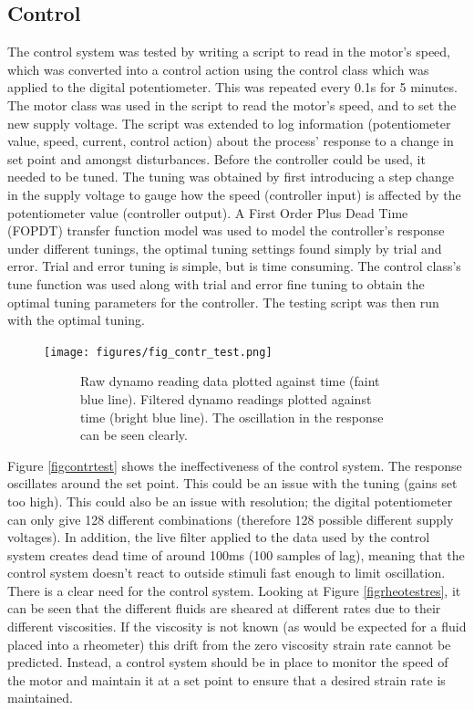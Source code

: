 \documentclass[twoside,a4]{report}
\def\br{\newline \newline \noindent}
\begin{document}
	\subsection*{Control}
	The control system was tested by writing a script to read in the motor's speed, which was converted into a control action using the control class which was applied to the digital potentiometer. This was repeated every 0.1s for 5 minutes. The motor class was used in the script to read the motor's speed, and to set the new supply voltage. The script was extended to log information (potentiometer value, speed, current, control action) about the process' response to a change in set point and amongst disturbances.
	\br
	Before the controller could be used, it needed to be tuned. The tuning was obtained by first introducing a step change in the supply voltage to gauge how the speed (controller input) is affected by the potentiometer value (controller output). A First Order Plus Dead Time (FOPDT) transfer function model was used to model the controller's response under different tunings, the optimal tuning settings found simply by trial and error.
	\br
	Trial and error tuning is simple, but is time consuming. The control class's tune function was used along with trial and error fine tuning to obtain the optimal tuning parameters for the controller. The testing script was then run with the optimal tuning.
	\newline
	
	\begin{figure}[!htb]
		\centering
		\texttt{[image: figures/fig\_contr\_test.png]}
		\caption{Controller Test}
		\label{figcontrtest}
		\begin{subfigure}{0.6\textwidth}
			\footnotesize Raw dynamo reading data plotted against time (faint blue line). Filtered dynamo readings plotted against time (bright blue line). The oscillation in the response can be seen clearly.
		\end{subfigure}
	\end{figure}
	
	\noindent
	Figure \ref{figcontrtest} shows the ineffectiveness of the control system. The response oscillates around the set point. This could be an issue with the tuning (gains set too high). This could also be an issue with resolution; the digital potentiometer can only give 128 different combinations (therefore 128 possible different supply voltages). In addition, the live filter applied to the data used by the control system creates dead time of around 100ms (100 samples of lag), meaning that the control system doesn't react to outside stimuli fast enough to limit oscillation. 
	\br
	There is a clear need for the control system. Looking at Figure \ref{figrheotestres}, it can be seen that the different fluids are sheared at different rates due to their different viscosities. If the viscosity is not known (as would be expected for a fluid placed into a rheometer) this drift from the zero viscosity strain rate cannot be predicted. Instead, a control system should be in place to monitor the speed of the motor and maintain it at a set point to ensure that a desired strain rate is maintained.
	
\end{document}
